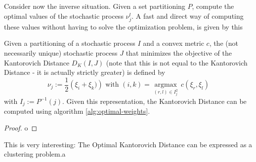 Consider now the inverse situation. Given a set partitioning $P$, compute the optimal values of the stochastic process $\nu_j^t$. A fast and direct way of computing these values without having to solve the optimization problem, is given by this
\begin{thm}
  Given a partitioning of a stochastic process $I$ and a convex metric $c$, the (not necessarily unique) stochastic process $J$ that minimizes the objective of the Kantorovich Distance $D_K(I,J)$ (note that this is not equal to the Kantorovich Distance - it is actually strictly greater) is defined by
  \begin{equation}
    \nu_j := \frac{1}{2}\left(\xi_i+\xi_k)\right)\text{ with }(i,k) = \underset{(r,l)\in I_j^2}{\operatorname{argmax}}\, c(\xi_r,\xi_l)
  \end{equation}
  with $I_j:=P^{-1}(j)$. Given this representation, the Kantorovich Distance can be computed using algorithm \ref{alg:optimal-weights}. 
\end{thm}
\begin{proof}
  o
\end{proof}
\begin{Note}
  This is very interesting: The Optimal Kantorovich Distance can be expressed as a clustering problem.a
\end{Note}
